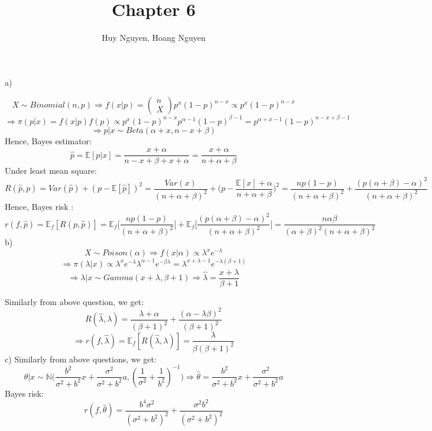 \documentclass[10pt]{article}
\newenvironment{problem}[2][Problem]{\begin{trivlist}
\item[\hskip \labelsep {\bfseries #1}\hskip \labelsep {\bfseries #2.}]}{\end{trivlist}}
\begin{document}
\title{Chapter 6}
\author{Huy Nguyen, Hoang Nguyen}
\maketitle
    
\begin{problem}{1}

a) 

\[X \sim Binomial(n, p) \Rightarrow f(x|p)= \begin{pmatrix}
n\\
X
\end{pmatrix} p^x (1-p)^{n-x} \propto p^x(1-p)^{n-x} \] 
\[\Rightarrow \pi (p|x)= f(x|p)f(p) \propto p^x(1-p)^{n-x}p^{\alpha -1}(1-p)^{\beta -1} =p^{\alpha + x -1}(1-p)^{n-x+\beta -1}\]
\[\Rightarrow p|x \sim Beta(\alpha+x, n-x+\beta)\]
Hence, Bayes estimator:
\[\hat{p}= \mathbb{E}[p|x]= \frac{x+\alpha}{n-x+\beta + x+ \alpha}= \frac{x+\alpha}{n+\alpha +\beta}\]
Under least mean square:
\[R(\hat{p}, p)= Var(\hat{p})+ (p-\mathbb{E}[\hat{p}])^2=\frac{Var(x)}{(n+\alpha + \beta)^2}+ \big( p-\frac{\mathbb{E}[x]+\alpha}{n+ \alpha + \beta}\big)^2= \frac{np(1-p)}{(n+ \alpha + \beta)^2} + \frac{(p(\alpha + \beta)-\alpha)^2}{(n+ \alpha + \beta)^2}\]
Hence, Bayes risk :
\[r(f, \hat{p})= \mathbb{E}_f [R(p, \hat{p})]= \mathbb{E}_f \big [ \frac{np(1-p)}{(n+ \alpha + \beta)^2} \big] + \mathbb{E}_f \big [ \frac{(p(\alpha + \beta)-\alpha)^2}{(n+ \alpha + \beta)^2} \big ]=\frac{n\alpha \beta}{(\alpha + \beta)^2 (n+ \alpha + \beta)^2}\]
b) 
\[X \sim Poison(\alpha) \Rightarrow f(x|\alpha) \propto  \lambda ^x e^{-\lambda}\]
\[ \Rightarrow \pi (\lambda | x) \propto \lambda ^x e^{-\lambda} \lambda ^{\alpha -1} e^{-\beta \lambda}= \lambda ^{x+\lambda -1} e^ {-\lambda (\beta + 1)}\]
\[\Rightarrow \lambda|x \sim Gamma(x+\lambda, \beta + 1) \Rightarrow \hat{\lambda}=\frac{x+\lambda}{\beta + 1}\]

Similarly from above question, we get:
\[R(\hat{\lambda}, \lambda)=\frac{\lambda + \alpha}{(\beta +1)^2} +\frac{(\alpha -\lambda \beta)^2}{(\beta +1)^2}\]
\[\Rightarrow r(f, \hat{\lambda})= \mathbb{E}_f[R(\hat{\lambda}, \lambda)]= \frac{\lambda}{\beta (\beta +1)^2}\]
c) 
Similarly from above questions, we get:
\[\theta | x \sim \mathbb{N}\big( \frac{b^2}{\sigma ^2 + b^2}x+\frac{\sigma ^2}{\sigma ^2 + b^2}a,(\frac{1}{\sigma ^2}+ \frac{1}{b^2})^{-1}\big) \Rightarrow \hat{\theta}= \frac{b^2}{\sigma ^2 + b^2}x+\frac{\sigma ^2}{\sigma ^2 + b^2}a\]
Bayes risk:
\[r(f, \hat{\theta})= \frac{b^4 \sigma ^2}{(\sigma ^2 + b^2)^2}+ \frac{\sigma ^2 b^2}{(\sigma ^2 + b^2)^2}\]



\end{problem}
\end{document}

